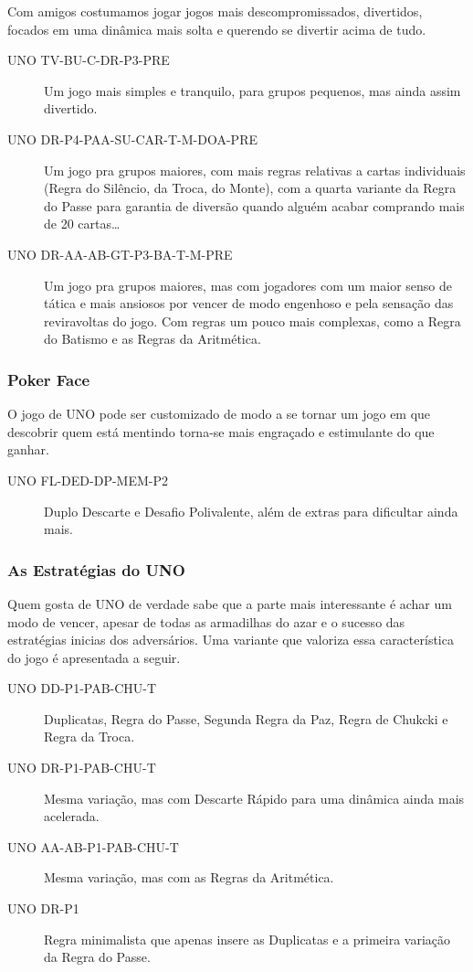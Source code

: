 Com amigos costumamos jogar jogos mais descompromissados, divertidos, focados em uma dinâmica mais solta e querendo se divertir acima de tudo.

\begin{description}
\item[UNO TV-BU-C-DR-P3-PRE]{Um jogo mais simples e tranquilo, para grupos pequenos, mas ainda assim divertido.}
\item[UNO DR-P4-PAA-SU-CAR-T-M-DOA-PRE]{Um jogo pra grupos maiores, com mais regras relativas a cartas individuais (Regra do Silêncio, da Troca, do Monte), com a quarta variante da Regra do Passe para garantia de diversão quando alguém acabar comprando mais de 20 cartas\ldots}
\item[UNO DR-AA-AB-GT-P3-BA-T-M-PRE]{Um jogo pra grupos maiores, mas com jogadores com um maior senso de tática e mais ansiosos por vencer de modo engenhoso e pela sensação das reviravoltas do jogo. Com regras um pouco mais complexas, como a Regra do Batismo e as Regras da Aritmética.}
\end{description}

\subsubsection{Poker Face}

O jogo de UNO pode ser customizado de modo a se tornar um jogo em que descobrir quem está mentindo torna-se mais engraçado e estimulante do que ganhar.

\begin{description}
\item[UNO FL-DED-DP-MEM-P2]{Duplo Descarte e Desafio Polivalente, além de extras para dificultar ainda mais.}
\end{description}

\subsubsection{As Estratégias do UNO}

Quem gosta de UNO de verdade sabe que a parte mais interessante é achar um modo de vencer, apesar de todas as armadilhas do azar e o sucesso das estratégias inicias dos adversários. Uma variante que valoriza essa característica do jogo é apresentada a seguir.

\begin{description}
\item[UNO DD-P1-PAB-CHU-T]{Duplicatas, Regra do Passe, Segunda Regra da Paz, Regra de Chukcki e Regra da Troca.}
\item[UNO DR-P1-PAB-CHU-T]{Mesma variação, mas com Descarte Rápido para uma dinâmica ainda mais acelerada.}
\item[UNO AA-AB-P1-PAB-CHU-T]{Mesma variação, mas com as Regras da Aritmética.}
\item[UNO DR-P1]{Regra minimalista que apenas insere as Duplicatas e a primeira variação da Regra do Passe.}
\end{description}

